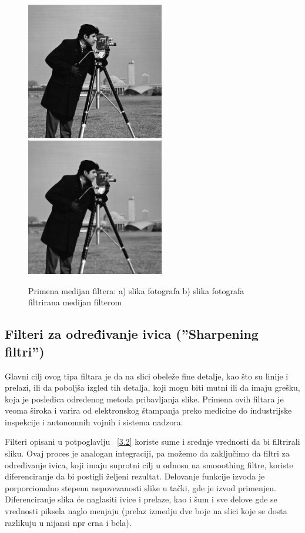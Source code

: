 \documentclass[a4paper,12pt,titlepage]{article}
\begin{document}
\begin{figure}[ht!]
\centering
\includegraphics[width=60mm]{img/img.png}
\includegraphics[width=60mm]{img/imgMed.png}
\caption{Primena medijan filtera: a) slika fotografa b) slika fotografa filtrirana medijan filterom}
\label{medijan}
\end{figure}

\subsection{Filteri za određivanje ivica (''Sharpening filtri'')}%

Glavni cilj ovog tipa filtara je da na slici obeleže fine detalje, kao što su linije i prelazi, ili da poboljša izgled tih detalja, koji mogu biti mutni ili da imaju grešku, koja je posledica određenog metoda pribavljanja slike. Primena ovih filtara je veoma široka i varira od elektronskog štampanja preko medicine do industrijske inspekcije i autonomnih vojnih i sistema nadzora. 

Filteri opisani u potpoglavlju ~\ref{3.2} koriste sume i srednje vrednosti da bi filtrirali sliku. Ovaj proces je analogan integraciji, pa možemo da zaključimo da filtri za određivanje ivica, koji imaju suprotni cilj u odnosu na smooothing filtre, koriste diferenciranje da bi postigli željeni rezultat. Delovanje funkcije izvoda je porporcionalno stepenu nepovezanosti slike u tački, gde je izvod primenjen. Diferenciranje slika će naglasiti ivice i prelaze, kao i šum i sve delove gde se vrednosti piksela naglo menjaju (prelaz izmedju dve boje na slici koje se dosta razlikuju u nijansi npr crna i bela).
\end{document}
